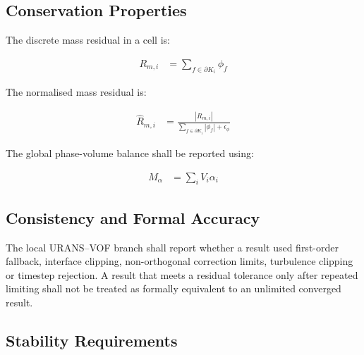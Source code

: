 \subsection{Conservation Properties}
\label{sec:res-num-stb-conservation-properties}


The discrete mass residual in a cell is:

\begin{align}
  R_{m,i}
  &=
  \sum_{f\in\partial K_i}
  \phi_f
  \label{eq:res-num-stb-local-mass-residual}
\end{align}

The normalised mass residual is:

\begin{align}
  \widehat{R}_{m,i}
  &=
  \frac{
    \left|
      R_{m,i}
    \right|
  }{
    \sum_{f\in\partial K_i}
    \left|
      \phi_f
    \right|
    +
    \epsilon_{\phi}
  }
  \label{eq:res-num-stb-local-normalised-mass-residual}
\end{align}

The global phase-volume balance shall be reported using:

\begin{align}
  M_{\alpha}
  &=
  \sum_i
  V_i\alpha_i
  \label{eq:res-num-stb-local-phase-volume}
\end{align}

\subsection{Consistency and Formal Accuracy}
\label{sec:res-num-stb-consistency-formal-accuracy}


The local URANS--VOF branch shall report whether a result used
first-order fallback, interface clipping, non-orthogonal correction
limits, turbulence clipping or timestep rejection. A result that meets
a residual tolerance only after repeated limiting shall not be treated
as formally equivalent to an unlimited converged result.

\subsection{Stability Requirements}
\label{sec:res-num-stb-stability-requirements}


